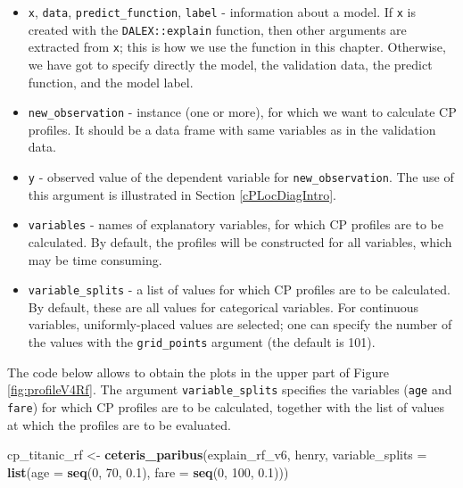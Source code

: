 \documentclass[12pt,]{krantz}
\newenvironment{Shaded}{\begin{snugshade}}{\end{snugshade}}
\newcommand{\DataTypeTok}[1]{\textcolor[rgb]{0.13,0.29,0.53}{#1}}
\newcommand{\DecValTok}[1]{\textcolor[rgb]{0.00,0.00,0.81}{#1}}
\newcommand{\FloatTok}[1]{\textcolor[rgb]{0.00,0.00,0.81}{#1}}
\newcommand{\KeywordTok}[1]{\textcolor[rgb]{0.13,0.29,0.53}{\textbf{#1}}}
\newcommand{\NormalTok}[1]{#1}
\newcommand{\StringTok}[1]{\textcolor[rgb]{0.31,0.60,0.02}{#1}}
\providecommand{\tightlist}{%
  \setlength{\itemsep}{0pt}\setlength{\parskip}{0pt}}
\theoremstyle{definition}
\theoremstyle{definition}
\theoremstyle{definition}
\theoremstyle{remark}
\begin{document}
\begin{itemize}
\tightlist
\item
  \texttt{x}, \texttt{data}, \texttt{predict\_function}, \texttt{label}
  - information about a model. If \texttt{x} is created with the
  \texttt{DALEX::explain} function, then other arguments are extracted
  from \texttt{x}; this is how we use the function in this chapter.
  Otherwise, we have got to specify directly the model, the validation
  data, the predict function, and the model label.
\item
  \texttt{new\_observation} - instance (one or more), for which we want
  to calculate CP profiles. It should be a data frame with same
  variables as in the validation data.
\item
  \texttt{y} - observed value of the dependent variable for
  \texttt{new\_observation}. The use of this argument is illustrated in
  Section \ref{cPLocDiagIntro}.
\item
  \texttt{variables} - names of explanatory variables, for which CP
  profiles are to be calculated. By default, the profiles will be
  constructed for all variables, which may be time consuming.
\item
  \texttt{variable\_splits} - a list of values for which CP profiles are
  to be calculated. By default, these are all values for categorical
  variables. For continuous variables, uniformly-placed values are
  selected; one can specify the number of the values with the
  \texttt{grid\_points} argument (the default is 101).
\end{itemize}

The code below allows to obtain the plots in the upper part of Figure
\ref{fig:profileV4Rf}. The argument \texttt{variable\_splits} specifies
the variables (\texttt{age} and \texttt{fare}) for which CP profiles are
to be calculated, together with the list of values at which the profiles
are to be evaluated.

\begin{Shaded}
\begin{Highlighting}[]
\NormalTok{cp_titanic_rf <-}\StringTok{ }\KeywordTok{ceteris_paribus}\NormalTok{(explain_rf_v6, henry,}
              \DataTypeTok{variable_splits =} \KeywordTok{list}\NormalTok{(}\DataTypeTok{age =} \KeywordTok{seq}\NormalTok{(}\DecValTok{0}\NormalTok{, }\DecValTok{70}\NormalTok{, }\FloatTok{0.1}\NormalTok{),}
                                     \DataTypeTok{fare =} \KeywordTok{seq}\NormalTok{(}\DecValTok{0}\NormalTok{, }\DecValTok{100}\NormalTok{, }\FloatTok{0.1}\NormalTok{)))}
\end{Highlighting}
\end{Shaded}
\end{document}
